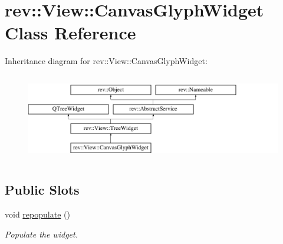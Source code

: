 \hypertarget{classrev_1_1_view_1_1_canvas_glyph_widget}{}\section{rev\+::View\+::Canvas\+Glyph\+Widget Class Reference}
\label{classrev_1_1_view_1_1_canvas_glyph_widget}
Inheritance diagram for rev\+::View\+::Canvas\+Glyph\+Widget\+:\begin{figure}[H]
\begin{center}
\leavevmode
\includegraphics[height=3.868739cm]{classrev_1_1_view_1_1_canvas_glyph_widget}
\end{center}
\end{figure}
\subsection*{Public Slots}
\begin{DoxyCompactItemize}
\item 
\mbox{\label{classrev_1_1_view_1_1_canvas_glyph_widget_a3d15e356f2598e78feb79c239a8dd3b6}} 
void \mbox{\hyperlink{classrev_1_1_view_1_1_canvas_glyph_widget_a3d15e356f2598e78feb79c239a8dd3b6}{repopulate}} ()
\begin{DoxyCompactList}\small\item\em Populate the widget. \end{DoxyCompactList}\end{DoxyCompactItemize}
